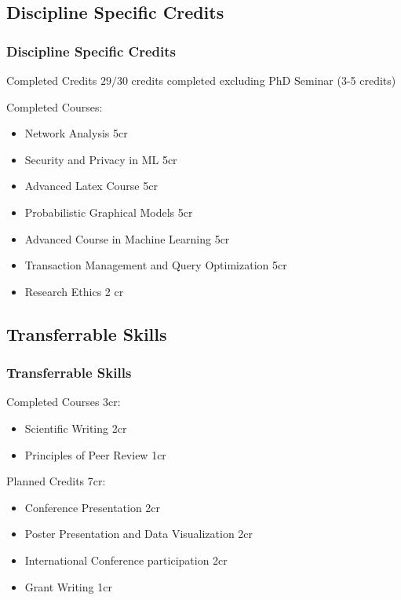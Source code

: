 \documentclass[pdf]{beamer}
\begin{document}
\subsection{Discipline Specific Credits}
\begin{frame}
    \frametitle{Discipline Specific Credits}

    \begin{block}{Completed Credits}
        $29/30$ credits completed excluding PhD Seminar (3-5 credits)
    \end{block}
    Completed Courses:
    \begin{itemize}
        \item Network Analysis 5cr
        \item Security and Privacy in ML 5cr
        \item Advanced Latex Course 5cr
        \item Probabilistic Graphical Models 5cr
        \item Advanced Course in Machine Learning 5cr 
        \item Transaction Management and Query Optimization 5cr
        \item Research Ethics 2 cr
    \end{itemize}
\end{frame}

\subsection{Transferrable Skills}

\begin{frame}
    \frametitle{Transferrable Skills}
    Completed Courses 3cr:
    \begin{itemize}
        \item Scientific Writing 2cr 
        \item Principles of Peer Review 1cr
    \end{itemize}
    Planned Credits 7cr:
    \begin{itemize}
        \item Conference Presentation 2cr   
        \item Poster Presentation and Data Visualization 2cr
        \item International Conference participation 2cr
        \item Grant Writing 1cr
    \end{itemize}

\end{frame}
\end{document}
